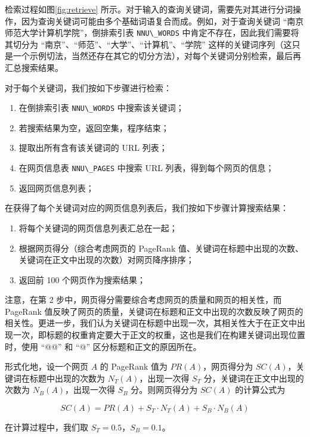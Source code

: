 \documentclass{ctexart}
\newcommand{\code}[1]{\colorbox{backcolor}{\lstinline|#1|}}
\begin{document}
    检索过程如图\ref{fig:retrieve} 所示。对于输入的查询关键词，需要先对其进行分词操作，因为查询关键词可能由多个基础词语复合而成。例如，对于查询关键词 “南京师范大学计算机学院”，倒排索引表 \code{NNU\_WORDS} 中肯定不存在，因此我们需要将其切分为 “南京”、“师范”、“大学”、“计算机”、“学院” 这样的关键词序列（这只是一个示例切法，当然还存在其它的切分方法），对每个关键词分别检索，最后再汇总搜索结果。

    对于每个关键词，我们按如下步骤进行检索：

    \begin{enumerate}
        \item 在倒排索引表 \code{NNU\_WORDS} 中搜索该关键词；
        \item 若搜索结果为空，返回空集，程序结束；
        \item 提取出所有含有该关键词的 URL 列表；
        \item 在网页信息表 \code{NNU\_PAGES} 中搜索 URL 列表，得到每个网页的信息；
        \item 返回网页信息列表；
    \end{enumerate}

    在获得了每个关键词对应的网页信息列表后，我们按如下步骤计算搜索结果：

    \begin{enumerate}
        \item 将每个关键词的网页信息列表汇总在一起；
        \item 根据网页得分（综合考虑网页的 PageRank 值、关键词在标题中出现的次数、关键词在正文中出现的次数）对网页降序排序；
        \item 返回前 100 个网页作为搜索结果；
    \end{enumerate}

    注意，在第 2 步中，网页得分需要综合考虑网页的质量和网页的相关性，而 PageRank 值反映了网页的质量，关键词在标题和正文中出现的次数反映了网页的相关性。更进一步，我们认为关键词在标题中出现一次，其相关性大于在正文中出现一次，即标题的权重肯定要大于正文的权重，这也是我们在构建关键词出现位置时，使用 “@@” 和 “@” 区分标题和正文的原因所在。

    形式化地，设一个网页 $A$ 的 PageRank 值为 $PR(A)$，网页得分为 $SC(A)$，关键词在标题中出现的次数为 $N_T(A)$，出现一次得 $S_T$ 分，关键词在正文中出现的次数为 $N_B(A)$，出现一次得 $S_B$ 分。则网页得分为 $SC(A)$ 的计算公式为

    $$ SC(A) = PR(A) + S_T \cdot N_T(A) + S_B \cdot N_B(A) $$

    在计算过程中，我们取 $S_T=0.5$，$S_B=0.1$。
\end{document}
